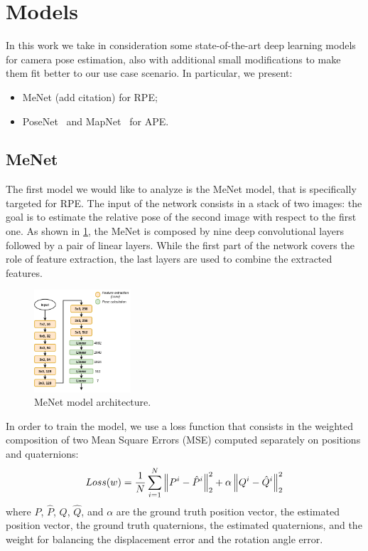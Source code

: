 \section{Models}
In this work we take in consideration some state-of-the-art deep learning models for camera pose estimation, also with additional small modifications to make them fit better to our use case scenario.
In particular, we present:
\begin{itemize}
    \item MeNet (add citation) for RPE;
    \item PoseNet~\cite{9348762} and MapNet~\cite{mapnet} for APE.
\end{itemize}

\subsection{MeNet}
The first model we would like to analyze is the MeNet model, that is specifically targeted for RPE.
The input of the network consists in a stack of two images: the goal is to estimate the relative pose of the second image with respect to the first one.
As shown in \cref{fig:menet-structure}, the MeNet is composed by nine deep convolutional layers followed by a pair of linear layers. While the first part of the network covers the role of feature extraction, the last layers are used to combine the extracted features.
\begin{figure}[htbp]
    \begin{center}
        \includegraphics[width=0.32\textwidth]{./imgs/menet_structure.png}
    \end{center}
    \caption{MeNet model architecture.}
    \label{fig:menet-structure}
\end{figure}

In order to train the model, we use a loss function that consists in the weighted composition of two Mean Square Errors (MSE) computed separately on positions and quaternions:
\begin{equation}
    Loss(w) = \frac{1}{N} \sum\limits_{i=1}^N \norm{P^i - \hat{P}^i}^2_2 + \alpha\norm{Q^i - \hat{Q}^i}^2_2
    \label{eq:menet-loss}
\end{equation}
where $P$, $\hat{P}$, $Q$, $\hat{Q}$, and $\alpha$ are the ground truth position vector, the estimated position vector, the ground truth quaternions, the estimated quaternions, and the weight for balancing the displacement error and the rotation angle error.


